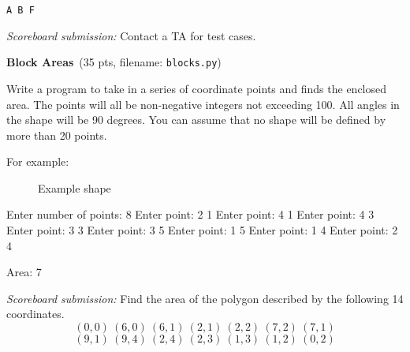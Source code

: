 \documentclass[11pt]{cselabheader}
\newcommand{\cop}[3]{\textbf{#1}~(#2 pts, filename: \texttt{#3})\quad}
\theoremstyle{plain}
\begin{document}
\begin{enumerate}
\begin{minipage}{.33\linewidth}
\begin{minipage}{.8\linewidth}
\begin{lstlisting}[style=bash]
A B F
        \end{lstlisting}
      \end{minipage}
    \end{minipage}

    \textit{Scoreboard submission:} Contact a TA for test cases.

  \item \cop{Block Areas}{35}{blocks.py}

    Write a program to take in a series of coordinate points and finds the 
    enclosed area. The points will all be non-negative integers not 
    exceeding 100. All angles in the shape will be 90 degrees. You can 
    assume that no shape will be defined by more than 20 points. 

    For example:
    \begin{figure}[!ht]
      \centering
      \caption{Example shape}
    \end{figure}

    \begin{verbatimcode}
Enter number of points: 8
Enter point: 2 1
Enter point: 4 1
Enter point: 4 3
Enter point: 3 3
Enter point: 3 5
Enter point: 1 5
Enter point: 1 4
Enter point: 2 4

Area: 7
    \end{verbatimcode}

    \textit{Scoreboard submission:} Find the area of the polygon described
    by the following 14 coordinates.
    \[
      (0, 0)~(6, 0)~(6, 1)~(2, 1)~(2, 2)~(7, 2)~(7, 1)
    \]
    \[
      (9, 1)~(9, 4)~(2, 4)~(2, 3)~(1, 3)~(1, 2)~(0, 2)
    \]

    \begin{figure}[!ht]
      \centering
\end{figure}
\end{enumerate}
\end{document}

